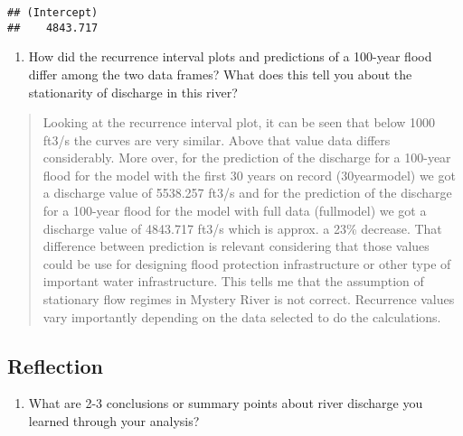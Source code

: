 \documentclass[]{article}
\providecommand{\tightlist}{%
  \setlength{\itemsep}{0pt}\setlength{\parskip}{0pt}}
\begin{document}
\begin{verbatim}
## (Intercept) 
##    4843.717
\end{verbatim}

\begin{enumerate}
\def\labelenumi{\arabic{enumi}.}
\setcounter{enumi}{11}
\tightlist
\item
  How did the recurrence interval plots and predictions of a 100-year
  flood differ among the two data frames? What does this tell you about
  the stationarity of discharge in this river?
\end{enumerate}

\begin{quote}
Looking at the recurrence interval plot, it can be seen that below 1000
ft3/s the curves are very similar. Above that value data differs
considerably. More over, for the prediction of the discharge for a
100-year flood for the model with the first 30 years on record
(30yearmodel) we got a discharge value of 5538.257 ft3/s and for the
prediction of the discharge for a 100-year flood for the model with full
data (fullmodel) we got a discharge value of 4843.717 ft3/s which is
approx. a 23\% decrease. That difference between prediction is relevant
considering that those values could be use for designing flood
protection infrastructure or other type of important water
infrastructure. This tells me that the assumption of stationary flow
regimes in Mystery River is not correct. Recurrence values vary
importantly depending on the data selected to do the calculations.
\end{quote}

\hypertarget{reflection}{%
\subsection{Reflection}\label{reflection}}

\begin{enumerate}
\def\labelenumi{\arabic{enumi}.}
\setcounter{enumi}{12}
\tightlist
\item
  What are 2-3 conclusions or summary points about river discharge you
  learned through your analysis?
\end{enumerate}
\end{document}
